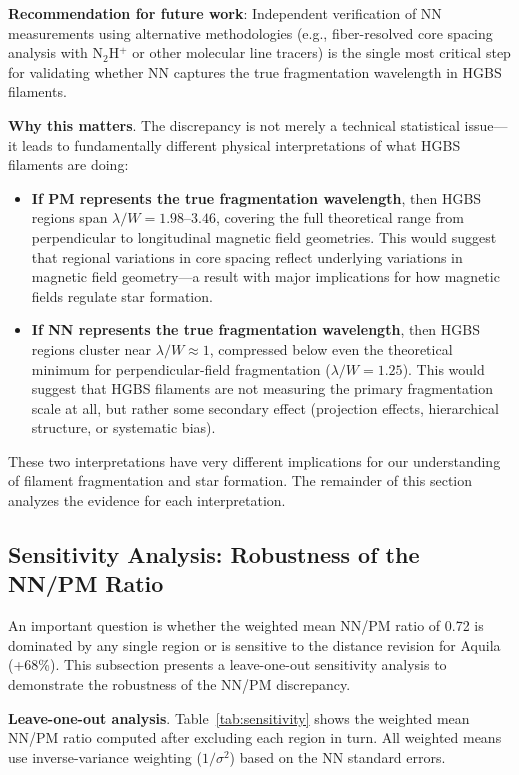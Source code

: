 \documentclass[twoside,twocolumn]{mnras}
\begin{document}
\textbf{Recommendation for future work}: Independent verification of NN measurements using alternative methodologies (e.g., fiber-resolved core spacing analysis with N$_2$H$^+$ or other molecular line tracers) is the single most critical step for validating whether NN captures the true fragmentation wavelength in HGBS filaments.

\textbf{Why this matters}. The discrepancy is not merely a technical statistical issue---it leads to fundamentally different physical interpretations of what HGBS filaments are doing:

\begin{itemize}
    \item \textbf{If PM represents the true fragmentation wavelength}, then HGBS regions span $\lambda/W = 1.98$--$3.46$, covering the full theoretical range from perpendicular to longitudinal magnetic field geometries. This would suggest that regional variations in core spacing reflect underlying variations in magnetic field geometry---a result with major implications for how magnetic fields regulate star formation.

    \item \textbf{If NN represents the true fragmentation wavelength}, then HGBS regions cluster near $\lambda/W \approx 1$, compressed below even the theoretical minimum for perpendicular-field fragmentation ($\lambda/W = 1.25$). This would suggest that HGBS filaments are not measuring the primary fragmentation scale at all, but rather some secondary effect (projection effects, hierarchical structure, or systematic bias).
\end{itemize}

These two interpretations have very different implications for our understanding of filament fragmentation and star formation. The remainder of this section analyzes the evidence for each interpretation.

\subsection{Sensitivity Analysis: Robustness of the NN/PM Ratio}
\label{sec:sensitivity}

An important question is whether the weighted mean NN/PM ratio of 0.72 is dominated by any single region or is sensitive to the distance revision for Aquila (+68\%). This subsection presents a leave-one-out sensitivity analysis to demonstrate the robustness of the NN/PM discrepancy.

\textbf{Leave-one-out analysis}. Table~\ref{tab:sensitivity} shows the weighted mean NN/PM ratio computed after excluding each region in turn. All weighted means use inverse-variance weighting ($1/\sigma^2$) based on the NN standard errors.
\end{document}
